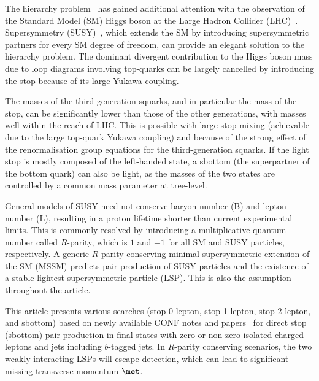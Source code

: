 \documentclass[UKenglish,10pt]{article}
\begin{document}
The hierarchy problem~\cite{Weinberg:1975gm,Gildener:1976ai,Weinberg:1979bn,Susskind:1978ms} 
has gained additional attention with the observation of the Standard Model (SM) Higgs boson at the Large Hadron Collider (LHC)~\cite{LHC:2008}. 
Supersymmetry (SUSY)~\cite{Miyazawa:1966,Ramond:1971gb,Golfand:1971iw,Neveu:1971rx,Neveu:1971iv,Gervais:1971ji,Volkov:1973ix,Wess:1973kz,Wess:1974tw}, which extends the SM by introducing supersymmetric partners for every SM degree of freedom, can provide an elegant solution to the hierarchy problem. The dominant divergent contribution to the Higgs boson mass due to loop diagrams involving top-quarks can be largely cancelled by introducing the stop because of its large Yukawa coupling.
\vspace{0.20cm}

\hspace{-0.60cm}
The masses of the third-generation squarks, and in particular the mass of the stop, can be significantly lower than those of the other generations, with masses well within the reach of LHC. This is possible with large stop mixing (achievable due to the large top-quark Yukawa coupling) and because of the strong effect of the renormalisation group equations for the third-generation squarks. If the light stop is mostly composed of the left-handed state, a sbottom (the superpartner of the bottom quark) can also be light, as the masses of the two states are controlled by a common mass parameter at tree-level.
\vspace{0.20cm}

\hspace{-0.60cm}
General models of SUSY need not conserve baryon number (B) and lepton number (L), resulting in a proton lifetime shorter than current experimental limits. This is commonly resolved by introducing a multiplicative quantum number called $R$-parity, which is $1$ and $-1$ for all SM and SUSY particles, respectively. A generic $R$-parity-conserving minimal supersymmetric extension of the SM (MSSM) predicts pair production of SUSY particles and the existence of a stable lightest supersymmetric particle (LSP). This is also the assumption throughout the article.
\vspace{0.20cm}

\hspace{-0.60cm}
This article presents various searches (stop 0-lepton, stop 1-lepton, stop 2-lepton, and sbottom) based on newly available CONF notes and papers~\cite{ATL-CONF-2017-020,ATL-CONF-2017-037,ATL-CONF-2017-034,ATL-CONF-2017-038} for direct stop (sbottom) pair production in final states with zero or non-zero isolated charged leptons and jets including $b$-tagged jets. In $R$-parity conserving scenarios, the two weakly-interacting LSPs will escape detection, which can lead to significant missing transverse-momentum $\met$. 
\end{document}
